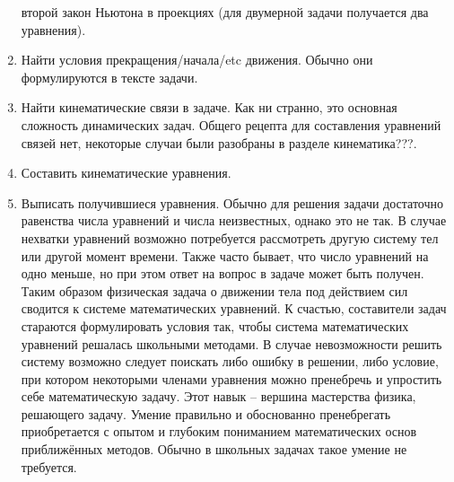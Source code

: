 \begin{enumerate}
второй закон Ньютона в проекциях (для двумерной задачи получается два уравнения).
\item Найти условия прекращения/начала/etc движения. Обычно они формулируются в тексте задачи.
\item Найти кинематические связи в задаче. Как ни странно, это основная сложность динамических
задач. Общего рецепта для составления уравнений связей нет, некоторые случаи были разобраны
в разделе кинематика???.
\item Составить кинематические уравнения.
\item Выписать получившиеся уравнения. Обычно для решения задачи достаточно
равенства числа уравнений и числа неизвестных, однако это не так. В случае нехватки
уравнений возможно потребуется рассмотреть другую систему тел или другой момент времени.
Также часто бывает, что число уравнений на одно меньше, но при этом ответ на вопрос в задаче может
быть получен. Таким образом физическая задача о движении тела под действием
сил сводится к системе математических уравнений. К счастью, составители задач стараются
формулировать условия так, чтобы система математических уравнений решалась школьными методами.
В случае невозможности решить систему возможно следует поискать либо ошибку в решении, либо условие,
при котором некоторыми членами уравнения можно пренебречь и упростить себе математическую задачу.
Этот навык -- вершина мастерства физика, решающего задачу. Умение правильно и обоснованно пренебрегать
приобретается с опытом и глубоким пониманием математических основ приближённых методов. Обычно
в школьных задачах такое умение не требуется.
\end{enumerate}


